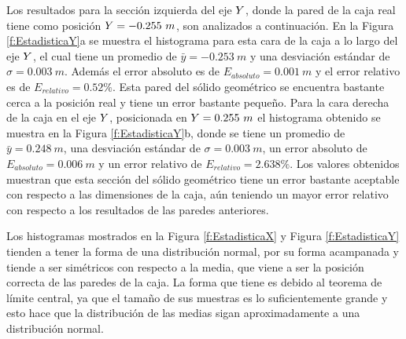 
Los resultados para la sección izquierda del eje $\mathnormal Y$, donde la pared de 
la caja real tiene como posición $\mathnormal Y = -0.255~m$, son analizados 
a continuación. En la Figura \ref{f:EstadisticaY}a se muestra el histograma para esta 
cara de la caja a lo largo del eje $\mathnormal Y$, el cual tiene un promedio de 
$\bar{y} = -0.253~m$ y una desviación estándar de $\sigma = 0.003~m$. Además el error 
absoluto es de $E_{absoluto} = 0.001~m$ y el error relativo es de $E_{relativo} = 0.52\%$. 
Esta pared del sólido geométrico se encuentra bastante cerca a la posición real y 
tiene un error bastante pequeño. Para la cara derecha de la caja en el eje $\mathnormal Y$, 
posicionada en $\mathnormal Y = 0.255~m$ el histograma obtenido se muestra en la 
Figura \ref{f:EstadisticaY}b, donde se tiene un promedio de $\bar{y} = 0.248~m$, 
una desviación estándar de $\sigma = 0.003~m$, un error absoluto de 
$E_{absoluto} = 0.006~m$ y un error relativo de $E_{relativo} = 
2.638\%$. Los valores obtenidos muestran que esta sección del sólido 
geométrico tiene un error bastante aceptable con respecto a las dimensiones de la 
caja, aún teniendo un mayor error relativo con respecto a los resultados de las
paredes anteriores.

Los histogramas mostrados en la Figura \ref{f:EstadisticaX} y Figura \ref{f:EstadisticaY}
tienden a tener la forma de una distribución normal, por su forma acampanada
y tiende a ser simétricos con respecto a la media, que viene a ser la posición correcta 
de las paredes de la caja. La forma que tiene es debido al teorema de límite central, ya 
que el tamaño de sus muestras es lo suficientemente grande y esto hace que la distribución 
de las medias sigan aproximadamente a una distribución normal.

